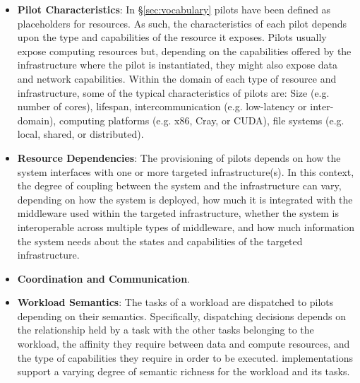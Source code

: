 \documentclass{sig-alternate}
\begin{document}
\begin{itemize}

\item \textbf{Pilot Characteristics}: In \S\ref{sec:vocabulary} pilots
  have been defined as placeholders for resources. As such, the
  characteristics of each pilot depends upon the type and capabilities
  of the resource it exposes.  Pilots usually expose computing
  resources but, depending on the capabilities offered by the
  infrastructure where the pilot is instantiated, they might also
  expose data and network capabilities. Within the domain of each type
  of resource and infrastructure, some of the typical characteristics
  of pilots are: Size (e.g. number of cores), lifespan,
  intercommunication (e.g. low-latency or inter-domain), computing
  platforms (e.g. x86, Cray, or CUDA), file systems (e.g. local,
  shared, or distributed).

\item \textbf{Resource Dependencies}: The provisioning of pilots
  depends on how the \pilotjob system interfaces with one or more
  targeted infrastructure(s). In this context, the degree of coupling
  between the \pilotjob system and the infrastructure can vary,
  depending on how the \pilotjob system is deployed, how much it is
  integrated with the middleware used within the targeted
  infrastructure, whether the \pilotjob system is interoperable across
  multiple types of middleware, and how much information the \pilotjob
  system needs about the states and capabilities of the targeted
  infrastructure.

\item \textbf{Coordination and Communication}. 

\item \textbf{Workload Semantics}: The tasks of a workload are
  dispatched to pilots depending on their semantics. Specifically,
  dispatching decisions depends on the relationship held by a task
  with the other tasks belonging to the workload, the affinity they
  require between data and compute resources, and the type of
  capabilities they require in order to be executed.  \pilotjob
  implementations support a varying degree of semantic richness for
  the workload and its tasks.


\end{itemize}
\end{document}
